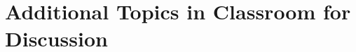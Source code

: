 \section{Additional Topics in Classroom for Discussion}

\begin{enumerate}
\end{enumerate}



\begin{thebibliography}{00}

\end{thebibliography}



